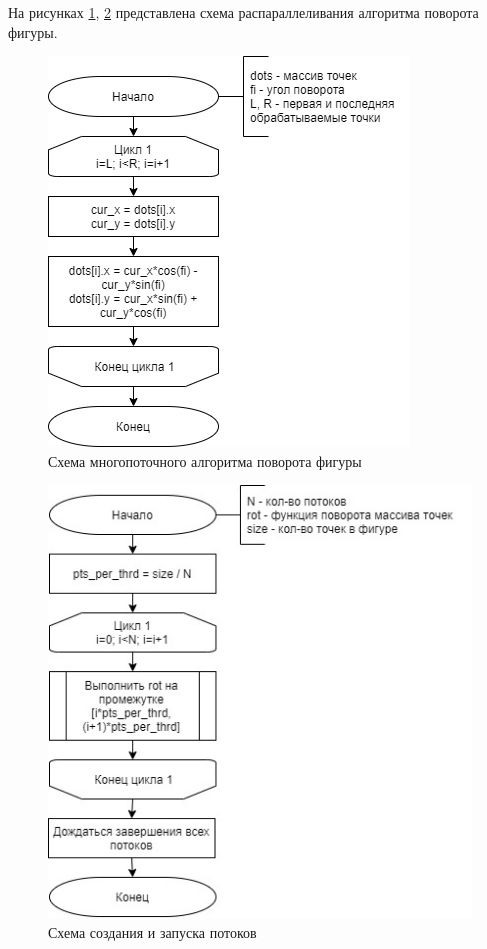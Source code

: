 \documentclass[12pt]{report}
\begin{document}
	\newpage
	
	На рисунках \ref{fig:paral}, \ref{fig:create} представлена схема распараллеливания алгоритма поворота фигуры.
	
	\begin{figure}[h]
		\centering
		\includegraphics[scale=1]{paral.jpg}
		\caption{Схема многопоточного алгоритма поворота фигуры}
		\label{fig:paral}
	\end{figure}
	
	\newpage
	
	\begin{figure}[h]
		\centering
		\includegraphics[scale=1]{create.jpg}
		\caption{Схема создания и запуска потоков}
		\label{fig:create}
	\end{figure}
	
\end{document}
